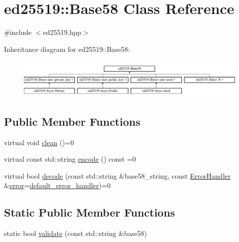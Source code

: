 \hypertarget{classed25519_1_1_base58}{}\section{ed25519\+:\+:Base58 Class Reference}
\label{classed25519_1_1_base58}


{\ttfamily \#include $<$ed25519.\+hpp$>$}

Inheritance diagram for ed25519\+:\+:Base58\+:\begin{figure}[H]
\begin{center}
\leavevmode
\includegraphics[height=1.917808cm]{classed25519_1_1_base58}
\end{center}
\end{figure}
\subsection*{Public Member Functions}
\begin{DoxyCompactItemize}
\item 
virtual void \mbox{\hyperlink{classed25519_1_1_base58_aed901927e6a283e0c4d3fb13745233dc}{clean}} ()=0
\item 
virtual const std\+::string \mbox{\hyperlink{classed25519_1_1_base58_a1b52a018a5215e2dcf2aa388b0fe06bf}{encode}} () const =0
\item 
virtual bool \mbox{\hyperlink{classed25519_1_1_base58_a3cb74be32923dcfb03a24b65015bee84}{decode}} (const std\+::string \&base58\+\_\+string, const \mbox{\hyperlink{namespaceed25519_a6ba572942b3c18591fc869d52a6b16e6}{Error\+Handler}} \&\mbox{\hyperlink{namespaceed25519_ac93d0b5156eaca22197055e902920bc4}{error}}=\mbox{\hyperlink{namespaceed25519_a7c7bb6ed17541162959c33ed3e3b15fb}{default\+\_\+error\+\_\+handler}})=0
\end{DoxyCompactItemize}
\subsection*{Static Public Member Functions}
\begin{DoxyCompactItemize}
\item 
static bool \mbox{\hyperlink{classed25519_1_1_base58_a269a450fc48ef8f77435fdb31b534fb4}{validate}} (const std\+::string \&base58)
\end{DoxyCompactItemize}


